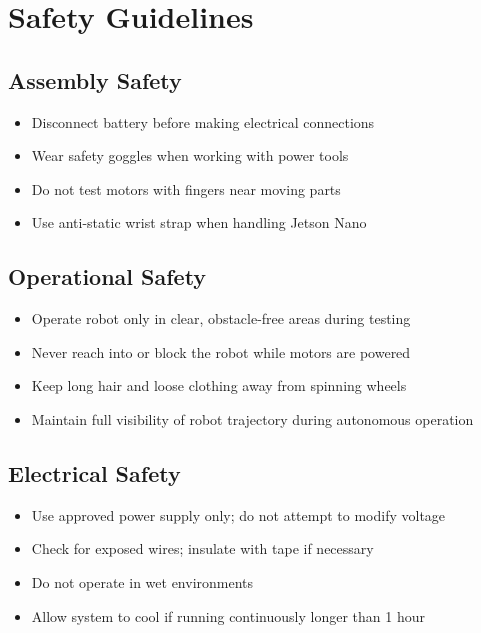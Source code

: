 %
%

\chapter{Safety Guidelines}

\section{Assembly Safety}

\begin{itemize}
    \item Disconnect battery before making electrical connections
    \item Wear safety goggles when working with power tools
    \item Do not test motors with fingers near moving parts
    \item Use anti-static wrist strap when handling Jetson Nano
\end{itemize}

\section{Operational Safety}

\begin{itemize}
    \item Operate robot only in clear, obstacle-free areas during testing
    \item Never reach into or block the robot while motors are powered
    \item Keep long hair and loose clothing away from spinning wheels
    \item Maintain full visibility of robot trajectory during autonomous operation
\end{itemize}

\section{Electrical Safety}

\begin{itemize}
    \item Use approved power supply only; do not attempt to modify voltage
    \item Check for exposed wires; insulate with tape if necessary
    \item Do not operate in wet environments
    \item Allow system to cool if running continuously longer than 1 hour
\end{itemize}

